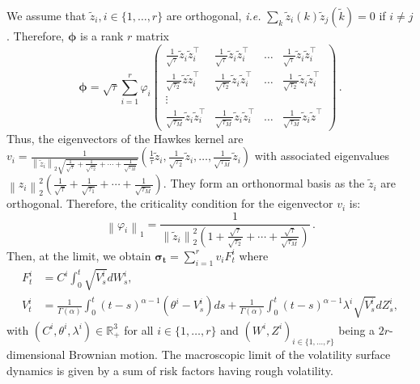 \documentclass[12pt]{article}
\newcommand{\norm}[1]{\left \lVert #1 \right \rVert_1}
\newcommand{\normsq}[1]{\left \lVert #1 \right \rVert_2}
\begin{document}
We assume that $\tilde z_i, i\in \{1,\dots,r\}$ are orthogonal, \textit{i.e.} $\sum_k \tilde z_i(k) \tilde z_j(\tilde k) = 0$ if $i \neq j$. Therefore, $\bm{\phi}$ is a rank $r$ matrix
\[
\bm{\phi} = \sqrt{\tau}  \sum_{i=1}^{r} \varphi_i \begin{pmatrix}
\frac{1}{\sqrt{\tau}}\tilde z_i \tilde z_i^\top & \frac{1}{\sqrt{\tau}}\tilde z_i \tilde z_i^\top & \dots & \frac{1}{\sqrt{\tau}}\tilde z_i \tilde z_i^\top\\
\frac{1}{\sqrt{\tau_2}} \tilde z \tilde z_i^\top &  \frac{1}{\sqrt{\tau_2}} \tilde z_i \tilde z_i^\top  & \dots & \frac{1}{\sqrt{\tau_2}} \tilde z_i \tilde z_i^\top \\
\vdots \\
\frac{1}{\sqrt{\tau_M}} \tilde z_i \tilde z_i^\top & \frac{1}{\sqrt{\tau_M}} \tilde z_i \tilde z_i^\top & \dots & \frac{1}{\sqrt{\tau_M}} \tilde z_i \tilde z^\top
\end{pmatrix} \, .
\]
Thus, the eigenvectors of the Hawkes kernel are
$v_{i} = \frac{1}{\normsq{\tilde z_i} \sqrt{\frac{1}{\sqrt{\tau}}+\frac{1}{\sqrt{\tau_2}} + \cdots + \frac{1}{\sqrt{\tau_M}}}} (\frac{1}{\tau}\tilde z_i ,\frac{1}{\sqrt{\tau_2}}  \tilde z_i, \dots, \frac{1}{\sqrt{\tau_M}}\tilde z_i )$ with associated eigenvalues $\normsq{z_i}^2 (\frac{1}{\sqrt{\tau}}+\frac{1}{\sqrt{\tau_1}} + \cdots + \frac{1}{\sqrt{\tau_M}})$. They form an orthonormal basis as the $\tilde z_i$ are orthogonal. Therefore, the criticality condition for the eigenvector $v_i$ is:
\[
\norm{\varphi_i} = \frac{1}{\normsq{\tilde z_i}^2 (1+\frac{\sqrt{\tau}}{\sqrt{\tau_2}} + \cdots + \frac{\sqrt{\tau}}{\sqrt{\tau_M}})} \, .
\]
Then, at the limit, we obtain  $\boldsymbol{\sigma_t} = \sum_{i=1}^{r}  v_{i} F^i_t$ where 
\begin{align*}
    F^{i}_t &= C^i \int_0^t \sqrt{V^i_s} dW^i_s, \\
    V^{i}_t &= \frac{1}{\Gamma(\alpha)} \int_0^t (t-s)^{\alpha - 1} (\theta^i - V^i_s) ds + \frac{1}{\Gamma(\alpha)} \int_0^t (t-s)^{\alpha - 1} \lambda^{i} \sqrt{V^i_s} dZ^i_s,
\end{align*}
with $(C^i,\theta^i,\lambda^i)\in \mathbb{R}_+^3$ for all $i\in \{1,\dots,r\}$ and $(W^i,Z^i)_{i\in\{1,\dots,r\}}$ being a $2r$-dimensional Brownian motion. The macroscopic limit of the volatility surface dynamics is given by a sum of risk factors having rough volatility.
\end{document}
